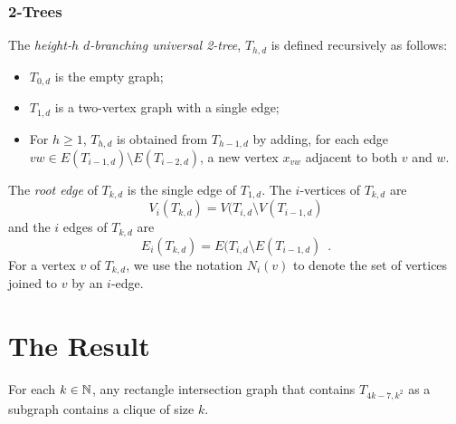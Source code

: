 \documentclass[lotsofwhite]{patmorin}
\begin{document}
\subsubsection{2-Trees}


The \emph{height-$h$ $d$-branching universal 2-tree}, $T_{h,d}$ is
defined recursively as follows:
\begin{itemize}
  \item $T_{0,d}$ is the empty graph;
  \item $T_{1,d}$ is a two-vertex graph with a single edge;
  \item For $h\ge 1$, $T_{h,d}$ is obtained from $T_{h-1,d}$ by adding,
     for each edge $vw \in E(T_{i-1,d})\setminus E(T_{i-2,d})$,
     a new vertex $x_{vw}$ adjacent to both $v$ and $w$.
\end{itemize}
The \emph{root edge} of $T_{k,d}$ is the single edge of $T_{1,d}$.
The $i$-vertices of $T_{k,d}$ are \[ V_i(T_{k,d}) = V(T_{i,d}\setminus
V(T_{i-1,d}) \] and the $i$ edges of $T_{k,d}$ are \[ E_i(T_{k,d})
= E(T_{i,d}\setminus E(T_{i-1,d}) \enspace . \] For a vertex $v$ of
$T_{k,d}$, we use the notation $N_i(v)$ to denote the set of vertices
joined to $v$ by an $i$-edge.


\section{The Result}

\begin{thm}
  For each $k\in \mathbb{N}$, any rectangle intersection graph that contains
  $T_{4k-7,k^2}$ as a subgraph contains a clique of size $k$.
\end{thm}
\end{document}
